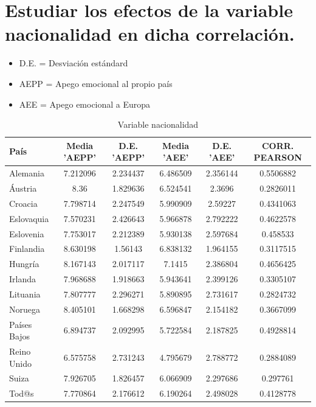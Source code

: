 \documentclass{article}
\begin{document}
\section{Estudiar los efectos de la variable nacionalidad en dicha correlación.}
 \begin{itemize}
 \item D.E. = Desviación estándard
 \item AEPP = Apego emocional al propio país
 \item AEE = Apego emocional a Europa
 \end{itemize}
 \begin{table}[h!]
 \caption{Variable nacionalidad}
 \begin{tabular}{l | c c c c c}
 \hline
 \bf{País} & \bf{Media 'AEPP'} & \bf{D.E. 'AEPP'} & \bf{Media 'AEE'} & \bf{D.E. 'AEE'} & \bf{CORR. PEARSON} \\
 \hline
 Alemania & 7.212096 & 2.234437 & 6.486509 & 2.356144 & 0.5506882 \\
 Áustria & 8.36 & 1.829636 & 6.524541 & 2.3696 & 0.2826011 \\
 Croacia & 7.798714 & 2.247549 & 5.990909 & 2.59227 & 0.4341063 \\
 Eslovaquia & 7.570231 & 2.426643 & 5.966878 & 2.792222 & 0.4622578 \\
 Eslovenia & 7.753017 & 2.212389 & 5.930138 & 2.597684 & 0.458533 \\
 Finlandia & 8.630198 & 1.56143 & 6.838132 & 1.964155 & 0.3117515 \\
 Hungría & 8.167143 & 2.017117 & 7.1415 & 2.386804 & 0.4656425 \\
 Irlanda & 7.968688 & 1.918663 & 5.943641 & 2.399126 & 0.3305107 \\
 Lituania & 7.807777 & 2.296271 & 5.890895 & 2.731617 & 0.2824732 \\
 Noruega & 8.405101 & 1.668298 & 6.596847 & 2.154182 & 0.3667099 \\
 Países Bajos & 6.894737 & 2.092995 & 5.722584 & 2.187825 & 0.4928814 \\
 Reino Unido & 6.575758 & 2.731243 & 4.795679 & 2.788772 & 0.2884089 \\
 Suiza & 7.926705 & 1.826457 & 6.066909 & 2.297686 & 0.297761 \\
 Tod@s & 7.770864 & 2.176612 & 6.190264 & 2.498028 & 0.4128778 \\
 \hline
 \end{tabular}
 \end{table}
\end{document}
